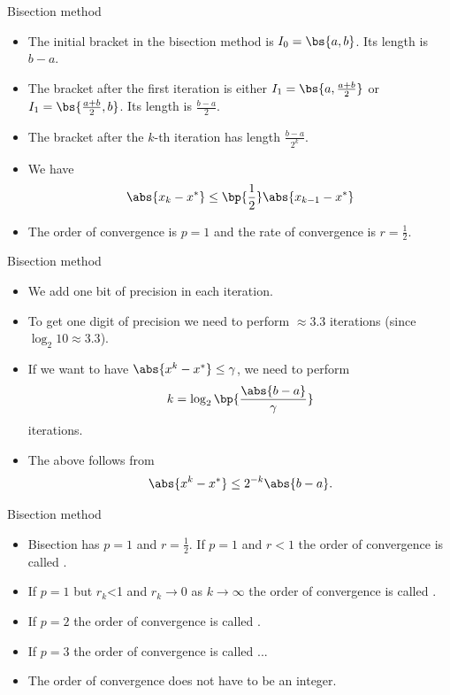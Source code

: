 \documentclass[11pt,xcolor={dvipsnames},aspectratio=159,hyperref={pdftex,pdfpagemode=UseNone,hidelinks,pdfdisplaydoctitle=true},usepdftitle=false]{beamer}
\begin{document}
\begin{frame}{Bisection method}
    
    \begin{itemize}
        \item The initial bracket in the bisection method is $I_0 = \bs{a,b}$. Its length is $b-a$.
        \item The bracket after the first iteration is either $I_1 = \bs{a,\frac{a+b}{2}}$ or $I_1 = \bs{\frac{a+b}{2},b}$. Its length is $\frac{b-a}{2}$.
        \item The bracket after the $k$-th iteration has length $\frac{b-a}{2^k}$.
        \item We have \begin{align*}
            \abs{x_k - x^*} \leq \bp{\frac{1}{2}}  \abs{x_{k-1} - x^*}
        \end{align*}
        \item The order of convergence is $p=1$ and the rate of convergence is $r = \frac{1}{2}$.
\end{itemize}
\end{frame}


\begin{frame}{Bisection method}
    
    \begin{itemize}
        \item We add one bit of precision in each iteration.
        \item To get one digit of precision we need to perform $\approx 3.3$ iterations (since $\log_2 10 \approx 3.3$).
        \item If we want to have $\abs{x^k - x^*} \leq \gamma$, we need to perform $$k=\log_2\bp{\frac{\abs{b-a}}{\gamma}}$$ iterations. 
        \item The above follows from $$\abs{x^k - x^*} \leq 2^{-k}\abs{b-a}.$$
\end{itemize}
\end{frame}

\begin{frame}{Bisection method}
    
    \begin{itemize}
        \item Bisection has $p=1$ and $r=\frac{1}{2}$. If $p=1$ and $r<1$ the order of convergence is called .
        \item If $p=1$ but $r_k$<1 and $r_k\rightarrow 0 $ as $k\rightarrow \infty$ the order of convergence is called .
        \item If $p=2$ the order of convergence is called .
        \item If $p=3$ the order of convergence is called ...
        \item The order of convergence does not have to be an integer.
\end{itemize}
\end{frame}
\end{document}
